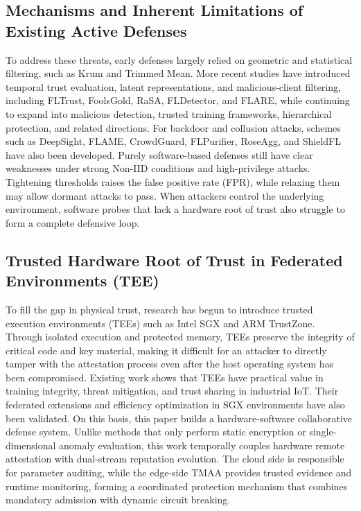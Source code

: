 \documentclass[11pt, a4paper]{article}
\begin{document}
\subsection{Mechanisms and Inherent Limitations of Existing Active Defenses}
To address these threats, early defenses largely relied on geometric and statistical filtering, such as Krum\cite{blanchard2017krum} and Trimmed Mean\cite{yin2018byzantine}. More recent studies have introduced temporal trust evaluation, latent representations, and malicious-client filtering, including FLTrust\cite{cao2021fltrust}, FoolsGold\cite{fung2020foolsgold}, RaSA\cite{wang2025rasa}, FLDetector\cite{fldetector2022}, and FLARE\cite{flare2022}, while continuing to expand into malicious detection\cite{dou2025toward}, trusted training frameworks\cite{lu2025tmt}, hierarchical protection\cite{wang2024federated}, and related directions. For backdoor and collusion attacks, schemes such as DeepSight\cite{deepsight2022}, FLAME\cite{flame2022}, CrowdGuard\cite{crowdguard2024}, FLPurifier\cite{flpurifier}, RoseAgg\cite{roseagg}, and ShieldFL\cite{shieldfl} have also been developed.
Purely software-based defenses still have clear weaknesses under strong Non-IID conditions and high-privilege attacks. Tightening thresholds raises the false positive rate (FPR), while relaxing them may allow dormant attacks to pass. When attackers control the underlying environment, software probes that lack a hardware root of trust also struggle to form a complete defensive loop.

\subsection{Trusted Hardware Root of Trust in Federated Environments (TEE)}
To fill the gap in physical trust, research has begun to introduce trusted execution environments (TEEs) such as Intel SGX and ARM TrustZone. Through isolated execution and protected memory, TEEs preserve the integrity of critical code and key material, making it difficult for an attacker to directly tamper with the attestation process even after the host operating system has been compromised\cite{zhang2025rppfl,liao2024verifiable}. Existing work shows that TEEs have practical value in training integrity\cite{r1_tee_integrity}, threat mitigation\cite{r5_tee_mitigating}, and trust sharing in industrial IoT\cite{r12_iot_tee}. Their federated extensions and efficiency optimization in SGX environments have also been validated\cite{xu2021distributed,yan2024efficient}.
On this basis, this paper builds a hardware-software collaborative defense system. Unlike methods that only perform static encryption or single-dimensional anomaly evaluation, this work temporally couples hardware remote attestation with dual-stream reputation evolution. The cloud side is responsible for parameter auditing, while the edge-side TMAA provides trusted evidence and runtime monitoring, forming a coordinated protection mechanism that combines mandatory admission with dynamic circuit breaking.
\end{document}
